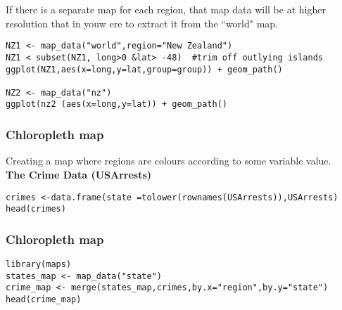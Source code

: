 \documentclass{beamer}
\begin{document}
\begin{frame}[fragile]
If there is a separate map for each region, that map data will be at
higher resolution that in youw ere to extract it from the ``world" map.


\begin{framed}
\begin{verbatim}
NZ1 <- map_data("world",region="New Zealand")
NZ1 < subset(NZ1, long>0 &lat> -48)  #trim off outlying islands
ggplot(NZ1,aes(x=long,y=lat,group=group)) + geom_path()

NZ2 <- map_data("nz")
ggplot(nz2 (aes(x=long,y=lat)) + geom_path()
\end{verbatim}
\end{framed}
\end{frame}





\begin{frame}[fragile]
\frametitle{Chloropleth map}
Creating a map where regions are colours according to some variable value.
\\

\textbf{The Crime Data (USArrests)}

\begin{framed}
\begin{verbatim}
crimes <-data.frame(state =tolower(rownames(USArrests)),USArrests)
head(crimes)
\end{verbatim}
\end{framed}
\end{frame}

\begin{frame}[fragile]
\frametitle{Chloropleth map}

\begin{framed}
\begin{verbatim}
library(maps)
states_map <- map_data("state")
crime_map <- merge(states_map,crimes,by.x="region",by.y="state")
head(crime_map)

\end{verbatim}
\end{framed}

\end{frame}
\end{document}
